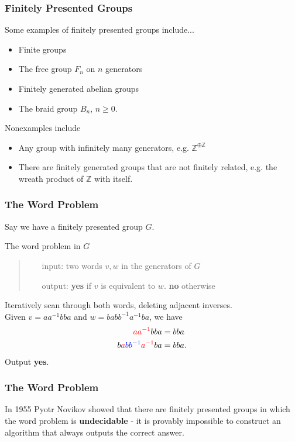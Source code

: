 \documentclass{beamer}
\newcommand{\integers}{\mathbb{Z}}
\begin{document}
\begin{frame}
	\frametitle{Finitely Presented Groups}
	Some examples of finitely presented groups include...\pause
	\begin{itemize}
		\item Finite groups\pause
		\item The free group $F_n$ on $n$ generators\pause
		\item Finitely generated abelian groups\pause
		\item The braid group $B_n$, $n\geq 0$.\pause
	\end{itemize}
	Nonexamples include\pause
	\begin{itemize}
		\item Any group with infinitely many generators, e.g. $\integers^{\oplus \integers}$\pause
		\item There are finitely generated groups that are not finitely related, e.g. the wreath product of $\integers$ with itself.
	\end{itemize}
\end{frame}

\begin{frame}
	\frametitle{The Word Problem}
	Say we have a finitely presented group $G$.\pause
	\begin{block}{The word problem in $G$}
		\begin{quote}
		\begin{itemize}
			\item[input: ]two words $v, w$ in the generators of $G$
			\item[output: ]\textbf{yes} if $v$ is equivalent to $w$. \textbf{no} otherwise
		\end{itemize}
		\end{quote}
	\end{block}\pause
	\begin{example}[The word problem in $F_2 = \langle a, b\rangle$]
		Iteratively scan through both words, deleting adjacent inverses.\\\pause
		Given $v = aa^{-1}bba$ and $w = babb^{-1}a^{-1}ba$, we have\pause
		\begin{align*}
			\color{red}aa^{-1}\color{black}bba &= bba\\
			b\color{red}a\color{blue}{bb^{-1}}\color{red}a^{-1}\color{black}ba &= bba.
		\end{align*}\pause
		Output \textbf{yes}.
	\end{example}
\end{frame}

\begin{frame}
	\frametitle{The Word Problem}
	In 1955 Pyotr Novikov showed that there are finitely presented groups in which the word problem is \textbf{undecidable} - it is provably impossible to construct an algorithm that always outputs the correct answer.
\end{frame}
\end{document}
